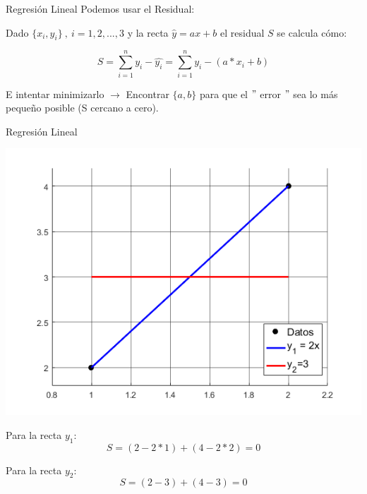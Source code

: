 \documentclass[xcolor=svgnames]{beamer} %
\theoremstyle{plain}
\renewcommand{\textbf}[1]{{\bfseries\textcolor{redUnq2}{#1}}}
\theoremstyle{definition}
\begin{document}

	
\begin{frame}{Regresión Lineal}
Podemos usar el Residual:\pause

Dado $\{x_i,y_i\}\ ,\ i =1,2,...,3$ y la recta $\hat y = a x+b$ el residual $S$ se calcula cómo:

$$ S = \sum_{i=1}^n y_i - \hat{y_i} = \sum_{i=1}^n y_i - (a* x_i +b) $$
\pause

E intentar minimizarlo $\rightarrow$ Encontrar $\{a,b\}$ para que el $"$ error $"$ sea lo más pequeño posible (S cercano a cero). 

\pause
\begin{tcolorbox}
\centering \textbf{No es buena idea!}
\end{tcolorbox}

\end{frame}


\begin{frame}{Regresión Lineal}
  \begin{minipage}{.6\linewidth}
    \includegraphics[width=\linewidth]{2pt_ResLin.png} 
  \end{minipage} \begin{minipage}{.35\linewidth}
    Para la recta $y_1$:
    $$ S = (2 - 2*1) + (4- 2*2) = 0$$
    
    Para la recta $y_2$:
    $$ S = (2- 3) + (4-3)  = 0$$
	  
  \end{minipage}
  
\end{frame}
\end{document}

